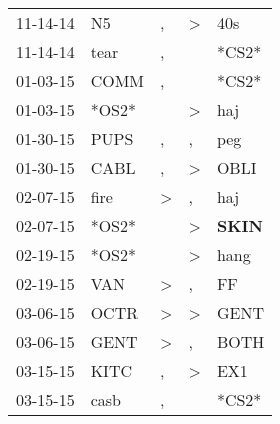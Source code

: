 \begin{supertabular}{p{0.07\textwidth}p{0.06\textwidth}p{0.02\textwidth}p{0.02\textwidth}p{0.06\textwidth}}
          11-14-14\textsuperscript{} &             N5\textsuperscript{} &                , &     \textgreater &            40s\textsuperscript{} \\
          11-14-14\textsuperscript{} &           tear\textsuperscript{} &                , &                  &                            *CS2* \\
          01-03-15\textsuperscript{} &           COMM\textsuperscript{} &                , &                  &                            *CS2* \\
          01-03-15\textsuperscript{} &                            *OS2* &                  &     \textgreater &            haj\textsuperscript{} \\
          01-30-15\textsuperscript{} &           PUPS\textsuperscript{} &                , &                , &            peg\textsuperscript{} \\
          01-30-15\textsuperscript{} &           CABL\textsuperscript{} &                , &     \textgreater &           OBLI\textsuperscript{} \\
          02-07-15\textsuperscript{} &           fire\textsuperscript{} &     \textgreater &                , &            haj\textsuperscript{} \\
          02-07-15\textsuperscript{} &                            *OS2* &                  &     \textgreater &  \textbf{SKIN\textsuperscript{}} \\
          02-19-15\textsuperscript{} &                            *OS2* &                  &     \textgreater &           hang\textsuperscript{} \\
          02-19-15\textsuperscript{} &            VAN\textsuperscript{} &     \textgreater &                , &             FF\textsuperscript{} \\
          03-06-15\textsuperscript{} &           OCTR\textsuperscript{} &     \textgreater &     \textgreater &           GENT\textsuperscript{} \\
          03-06-15\textsuperscript{} &           GENT\textsuperscript{} &     \textgreater &                , &           BOTH\textsuperscript{} \\
          03-15-15\textsuperscript{} &           KITC\textsuperscript{} &                , &     \textgreater &            EX1\textsuperscript{} \\
          03-15-15\textsuperscript{} &           casb\textsuperscript{} &                , &                  &                            *CS2* \\

\end{supertabular}
